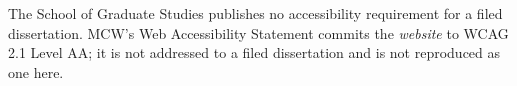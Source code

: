 



	{The School of Graduate Studies publishes no accessibility requirement for a
	 filed dissertation. MCW's Web Accessibility Statement commits the
	 \emph{website} to WCAG 2.1 Level AA; it is not addressed to a filed
	 dissertation and is not reproduced as one here.}


